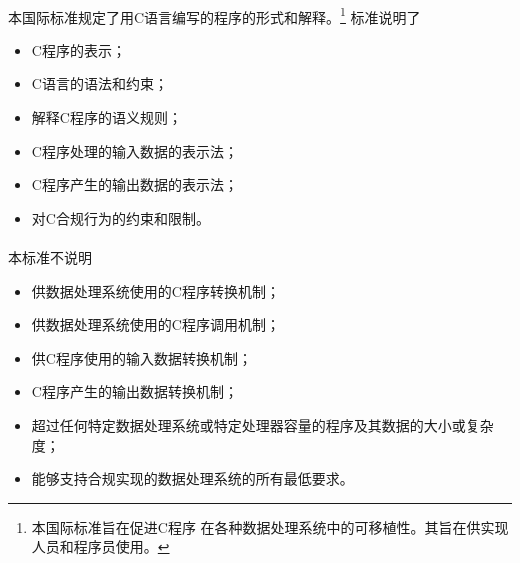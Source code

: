 
\paragraph{}
本国际标准规定了用C语言编写的程序的形式和解释。\footnote{本国际标准旨在促进C程序
在各种数据处理系统中的可移植性。其旨在供实现人员和程序员使用。} 标准说明了
\begin{itemize}
  \item{C程序的表示；}
  \item{C语言的语法和约束；}
  \item{解释C程序的语义规则；}
  \item{C程序处理的输入数据的表示法；}
  \item{C程序产生的输出数据的表示法；}
  \item{对C合规行为的约束和限制。}
\end{itemize}

\paragraph{}
本标准不说明
\begin{itemize}
  \item{供数据处理系统使用的C程序转换机制；}
  \item{供数据处理系统使用的C程序调用机制；}
  \item{供C程序使用的输入数据转换机制；}
  \item{C程序产生的输出数据转换机制；}
  \item{超过任何特定数据处理系统或特定处理器容量的程序及其数据的大小或复杂度；}
  \item{能够支持合规实现的数据处理系统的所有最低要求。}
\end{itemize}
